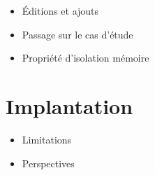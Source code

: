 \documentclass{phdthesis}
\begin{document}
\begin{itemize}
  \item Éditions et ajouts
  \item Passage sur le cas d'étude
  \item Propriété d'isolation mémoire
\end{itemize}

\chapter{Implantation}


\begin{itemize}
  \item Limitations
  \item Perspectives
\end{itemize}

%
%
\end{document}
